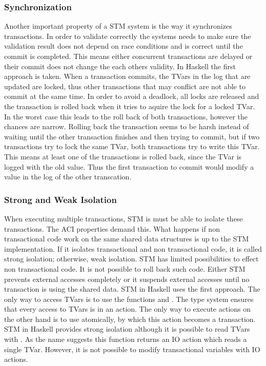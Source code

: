 \subsubsection{Synchronization} Another important property of a STM system is the way it synchronizes transactions. In order to validate
correctly the systems needs to make sure the validation result does not depend on race conditions and is correct until the commit 
is completed. This means either concurrent transactions are delayed or their commit does not change the each others validity. In Haskell the first
approach is taken. When a transaction commits, the TVars in the log that are updated are locked, thus other transactions that may conflict are not 
able to commit at the same time. In order to avoid a deadlock, all locks are released and the transaction
is rolled back when it tries to aquire the lock for a locked TVar. In the worst case this leads to the roll back of both transactions, 
however the chances are narrow. Rolling back the transaction seems to be harsh instead of waiting until the other transaction finishes 
and then trying to commit, but if two transactions try to lock the same TVar, both transactions try to write this TVar. 
This means at least one of the transactions is rolled back, since the TVar is logged with the old value. 
Thus the first transaction to commit would modify a value in the log of the other transcation.

\subsubsection{Strong and Weak Isolation} When executing multiple transactions, STM is must be able to isolate these transactions.
The ACI properties demand this. What happens if non transactional code work on the same shared data structures is up to the STM 
implementation. If it isolates transactional and non transactional code, it is called strong isolation; otherwise, weak isolation.
STM has limited possibilities to effect non transactional code. It is not possible to roll back such code. Either STM prevents 
external accesses completely or it suspends external accesses until no transaction is using the shared data. STM in Haskell uses 
the first approach. The only way to access TVars is to use the functions  and . The type system 
ensures that every access to TVars is in an  action. The only way to execute  actions on the other hand is
to use atomically, by which this action becomes a transaction. STM in Haskell provides strong isolation although it is possible 
to read TVars with . As the name suggests this function returns an IO action which reads a single TVar. 
However, it is not possible to modify transactional variables with IO actions. 



